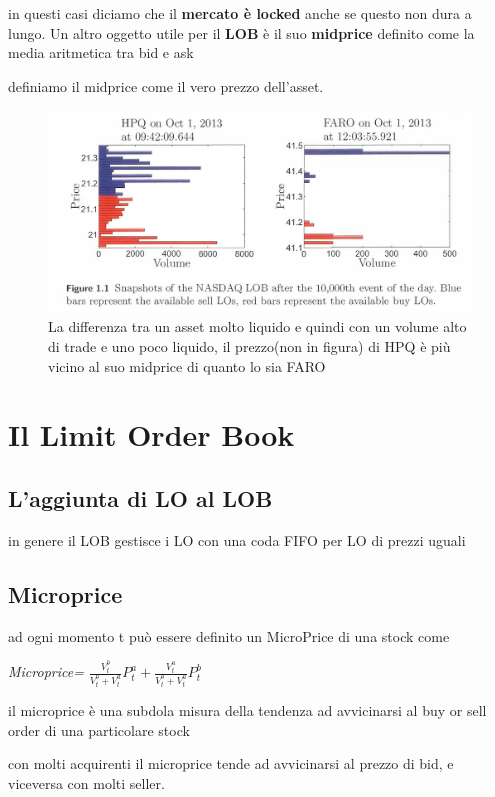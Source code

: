 \documentclass[a4paper,11pt]{report}
\begin{document}
{	in questi casi diciamo che il \textbf{mercato è locked} anche se questo non dura a lungo. \newline
	Un altro oggetto utile per il \textbf{LOB} è il suo \textbf{midprice} definito come la media aritmetica tra bid e ask

	definiamo il midprice come il vero prezzo dell'asset.

\begin{figure}[h!]
\includegraphics[width=\linewidth]{LOB.png}
\caption {La differenza tra un asset molto liquido e quindi con un volume alto di trade e uno poco liquido, il prezzo(non in figura) di HPQ è più vicino al suo midprice di quanto lo sia FARO}
\end{figure}

\newpage


\section{Il Limit Order Book}
\subsection{L'aggiunta di LO al LOB}
	in genere il LOB gestisce i LO con una coda FIFO per LO di prezzi uguali
\subsection{Microprice}
	ad ogni momento t può essere definito un MicroPrice di una stock come
\begin{center}
	{\emph{Microprice= ${\frac {V_t^b}{V_t^b + V_t^a}}P_t^a + {\frac {V_t^a}{V_t^b+V_t^a}}P_t^b$}}
\end{center}
	il microprice è una subdola misura della tendenza ad avvicinarsi al buy or sell order di una particolare stock

	con molti acquirenti il microprice tende ad avvicinarsi al prezzo di bid, e viceversa con molti seller.
}
\end{document}

